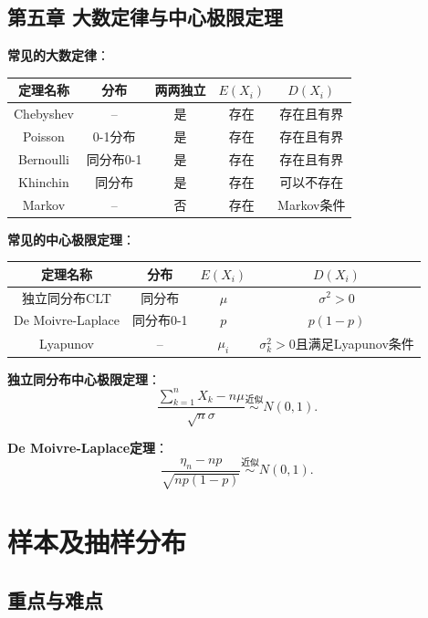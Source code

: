 \documentclass[11pt,a4paper]{report}
\theoremstyle{definition}
\theoremstyle{plain}
\begin{document}
\section{第五章 大数定律与中心极限定理}

\textbf{常见的大数定律}：

\begin{center}
\begin{tabular}{c|c|c|c|c}
\hline
定理名称 & 分布 & 两两独立 & $E(X_i)$ & $D(X_i)$ \\
\hline
Chebyshev & -- & 是 & 存在 & 存在且有界 \\
Poisson & 0-1分布 & 是 & 存在 & 存在且有界 \\
Bernoulli & 同分布0-1 & 是 & 存在 & 存在且有界 \\
Khinchin & 同分布 & 是 & 存在 & 可以不存在 \\
Markov & -- & 否 & 存在 & Markov条件 \\
\hline
\end{tabular}
\end{center}

\textbf{常见的中心极限定理}：

\begin{center}
\begin{tabular}{c|c|c|c}
\hline
定理名称 & 分布 & $E(X_i)$ & $D(X_i)$ \\
\hline
独立同分布CLT & 同分布 & $\mu$ & $\sigma^2>0$ \\
De Moivre-Laplace & 同分布0-1 & $p$ & $p(1-p)$ \\
Lyapunov & -- & $\mu_i$ & $\sigma_k^2>0$且满足Lyapunov条件 \\
\hline
\end{tabular}
\end{center}

\textbf{独立同分布中心极限定理}：
\[
\frac{\sum_{k=1}^{n}X_k-n\mu}{\sqrt{n}\sigma}\stackrel{\text{近似}}{\sim}N(0,1).
\]

\textbf{De Moivre-Laplace定理}：
\[
\frac{\eta_n-np}{\sqrt{np(1-p)}}\stackrel{\text{近似}}{\sim}N(0,1).
\]


\newpage
\chapter{样本及抽样分布}

\section{重点与难点}
\end{document}
